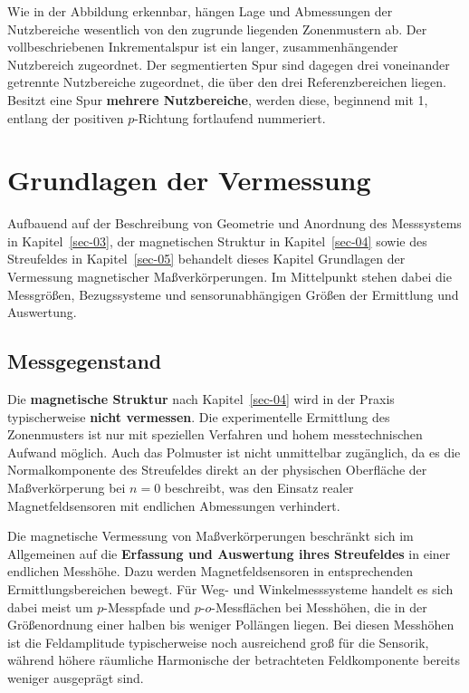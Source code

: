 \documentclass[
  ngerman,
  a4paper,
  twoside]{scrbook}
\begin{document}
Wie in der Abbildung erkennbar, hängen Lage und Abmessungen der
Nutzbereiche wesentlich von den zugrunde liegenden Zonenmustern ab. Der
vollbeschriebenen Inkrementalspur ist ein langer, zusammenhängender
Nutzbereich zugeordnet. Der segmentierten Spur sind dagegen drei
voneinander getrennte Nutzbereiche zugeordnet, die über den drei
Referenzbereichen liegen. Besitzt eine Spur \textbf{mehrere
Nutzbereiche}, werden diese, beginnend mit 1, entlang der positiven
\(p\)-Richtung fortlaufend nummeriert.


\chapter{Grundlagen der Vermessung}\label{sec-06}

Aufbauend auf der Beschreibung von Geometrie und Anordnung des
Messsystems in Kapitel~\ref{sec-03}, der magnetischen Struktur in
Kapitel~\ref{sec-04} sowie des Streufeldes in Kapitel~\ref{sec-05}
behandelt dieses Kapitel Grundlagen der Vermessung magnetischer
Maßverkörperungen. Im Mittelpunkt stehen dabei die Messgrößen,
Bezugssysteme und sensorunabhängigen Größen der Ermittlung und
Auswertung.

\section{Messgegenstand}\label{sec-06-messgegenstand}

Die \textbf{magnetische Struktur} nach Kapitel~\ref{sec-04} wird in der
Praxis typischerweise \textbf{nicht vermessen}. Die experimentelle
Ermittlung des Zonenmusters ist nur mit speziellen Verfahren und hohem
messtechnischen Aufwand möglich. Auch das Polmuster ist nicht
unmittelbar zugänglich, da es die Normalkomponente des Streufeldes
direkt an der physischen Oberfläche der Maßverkörperung bei \(n = 0\)
beschreibt, was den Einsatz realer Magnetfeldsensoren mit endlichen
Abmessungen verhindert.

Die magnetische Vermessung von Maßverkörperungen beschränkt sich im
Allgemeinen auf die \textbf{Erfassung und Auswertung ihres Streufeldes}
in einer endlichen Messhöhe. Dazu werden Magnetfeldsensoren in
entsprechenden Ermittlungsbereichen bewegt. Für Weg- und
Winkelmesssysteme handelt es sich dabei meist um \(p\)-Messpfade und
\(p\)-\(o\)-Messflächen bei Messhöhen, die in der Größenordnung einer
halben bis weniger Pollängen liegen. Bei diesen Messhöhen ist die
Feldamplitude typischerweise noch ausreichend groß für die Sensorik,
während höhere räumliche Harmonische der betrachteten Feldkomponente
bereits weniger ausgeprägt sind.
\end{document}
